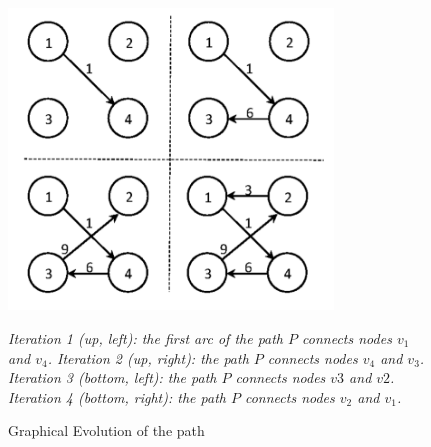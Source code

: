 \begin{figure}[h]
    \centering
    \includegraphics[height=8cm, keepaspectratio]{images/graphical-evolution-of-path}
    \caption{Graphical Evolution of the path}
    \label{fig:graphical-evolution-of-path}
    \small{\textit{Iteration 1 (up, left): the first arc of the path $P$ connects nodes $v_1$ and $v_4$. Iteration 2 (up, right): the path $P$ connects nodes $v_4$ and $v_3$. Iteration 3 (bottom, left): the path $P$ connects nodes $v3$ and $v2$. Iteration 4 (bottom, right): the path $P$ connects nodes $v_2$ and $v_1$.}}
\end{figure}

